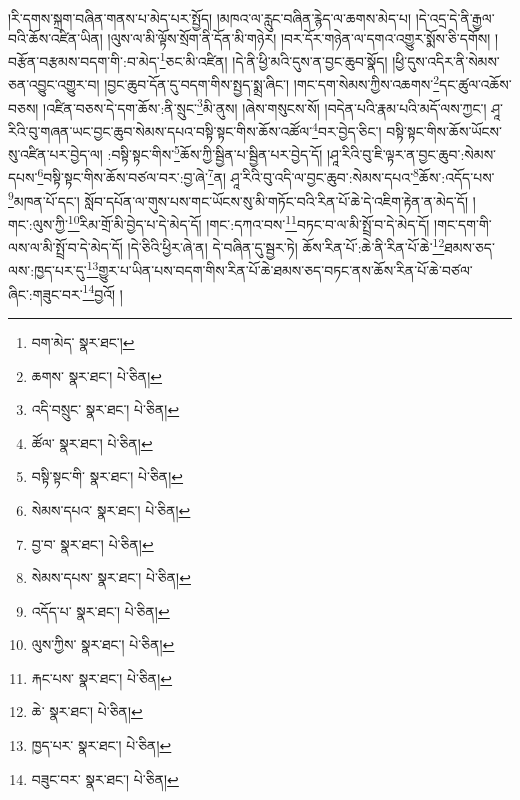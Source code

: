 །རི་དགས་སྐྲག་བཞིན་གནས་པ་མེད་པར་སྤྱོད། །མཁའ་ལ་རླུང་བཞིན་རྙེད་ལ་ཆགས་མེད་པ། །དེ་འདྲ་དེ་ནི་རྒྱལ་བའི་ཆོས་འཛིན་ཡིན། །ལུས་ལ་མི་ལྟོས་སྲོག་ནི་དོན་མི་གཉེར། །བར་དོར་གཉེན་ལ་དགའ་འགྱུར་སྨོས་ཅི་དགོས། །བརྩོན་བརྩམས་བདག་གི་:བ་མེད་\footnote{བག་མེད་  སྣར་ཐང་། }ཅང་མི་འཛིན། །དེ་ནི་ཕྱི་མའི་དུས་ན་བྱང་ཆུབ་སྣོད། །ཕྱི་དུས་འདིར་ནི་སེམས་ཅན་འབྱུང་འགྱུར་བ། །བྱང་ཆུབ་དོན་དུ་བདག་གིས་སྤྱད་སྨྲ་ཞིང་། །གང་དག་སེམས་ཀྱིས་འཆགས་\footnote{ཆགས་  སྣར་ཐང་།  པེ་ཅིན། }དང་ཚུལ་འཆོས་བཅས། །འཛིན་བཅས་དེ་དག་ཆོས་:ནི་སྲུང་\footnote{འདི་བསྲུང་  སྣར་ཐང་།  པེ་ཅིན། }མི་ནུས། །ཞེས་གསུངས་སོ། །བདེན་པའི་རྣམ་པའི་མདོ་ལས་ཀྱང་། ཤཱ་རིའི་བུ་གཞན་ཡང་བྱང་ཆུབ་སེམས་དཔའ་བསྟི་སྟང་གིས་ཆོས་འཚོལ་\footnote{ཚོལ་  སྣར་ཐང་།  པེ་ཅིན། }བར་བྱེད་ཅིང་། བསྟི་སྟང་གིས་ཆོས་ཡོངས་སུ་འཛིན་པར་བྱེད་ལ། :བསྟི་སྟང་གིས་\footnote{བསྟི་སྟང་གི་  སྣར་ཐང་།  པེ་ཅིན། }ཆོས་ཀྱི་སྦྱིན་པ་སྦྱིན་པར་བྱེད་དོ། །ཤཱ་རིའི་བུ་ཇི་ལྟར་ན་བྱང་ཆུབ་:སེམས་དཔས་\footnote{སེམས་དཔའ་  སྣར་ཐང་།  པེ་ཅིན། }བསྟི་སྟང་གིས་ཆོས་བཙལ་བར་:བྱ་ཞེ་\footnote{བྱ་བ་  སྣར་ཐང་།  པེ་ཅིན། }ན། ཤཱ་རིའི་བུ་འདི་ལ་བྱང་ཆུབ་:སེམས་དཔའ་\footnote{སེམས་དཔས་  སྣར་ཐང་།  པེ་ཅིན། }ཆོས་:འདོད་པས་\footnote{འདོད་པ་  སྣར་ཐང་།  པེ་ཅིན། }མཁན་པོ་དང་། སློབ་དཔོན་ལ་གུས་པས་གང་ཡོངས་སུ་མི་གཏོང་བའི་རིན་པོ་ཆེ་དེ་འཇིག་རྟེན་ན་མེད་དོ། །གང་:ལུས་ཀྱི་\footnote{ལུས་ཀྱིས་  སྣར་ཐང་།  པེ་ཅིན། }རིམ་གྲོ་མི་བྱེད་པ་དེ་མེད་དོ། །གང་:དཀའ་བས་\footnote{རྐང་པས་  སྣར་ཐང་།  པེ་ཅིན། }བཏང་བ་ལ་མི་སྤྲོ་བ་དེ་མེད་དོ། །གང་དག་གི་ལས་ལ་མི་སྤྲོ་བ་དེ་མེད་དོ། །དེ་ཅིའི་ཕྱིར་ཞེ་ན། དེ་བཞིན་དུ་སྦྱར་ཏེ། ཆོས་རིན་པོ་:ཆེ་ནི་རིན་པོ་ཆེ་\footnote{ཆེ་  སྣར་ཐང་།  པེ་ཅིན། }ཐམས་ཅད་ལས་:ཁྱད་པར་དུ་\footnote{ཁྱད་པར་  སྣར་ཐང་།  པེ་ཅིན། }གྱུར་པ་ཡིན་པས་བདག་གིས་རིན་པོ་ཆེ་ཐམས་ཅད་བཏང་ནས་ཆོས་རིན་པོ་ཆེ་བཙལ་ཞིང་:གཟུང་བར་\footnote{བཟུང་བར་  སྣར་ཐང་།  པེ་ཅིན། }བྱའོ། །
